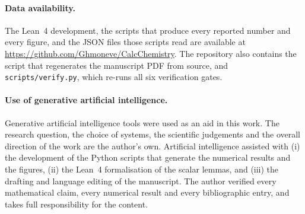 \documentclass[11pt,a4paper]{article}
\theoremstyle{plain}
\theoremstyle{definition}
\theoremstyle{remark}
\begin{document}
\paragraph{Data availability.}
The Lean~4 development, the scripts that produce every reported number and every
figure, and the JSON files those scripts read are available at
\url{https://github.com/Ghmoneve/CalcChemistry}. The repository also contains the
script that regenerates the manuscript PDF from source, and
\texttt{scripts/verify.py}, which re-runs all six verification gates.

\paragraph{Use of generative artificial intelligence.}
Generative artificial intelligence tools were used as an aid in this work. The
research question, the choice of systems, the scientific judgements and the
overall direction of the work are the author's own. Artificial intelligence
assisted with (i) the development of the Python scripts that generate the
numerical results and the figures, (ii) the Lean~4 formalisation of the scalar
lemmas, and (iii) the drafting and language editing of the manuscript. The
author verified every mathematical claim, every numerical result and every
bibliographic entry, and takes full responsibility for the content.



\end{document}
